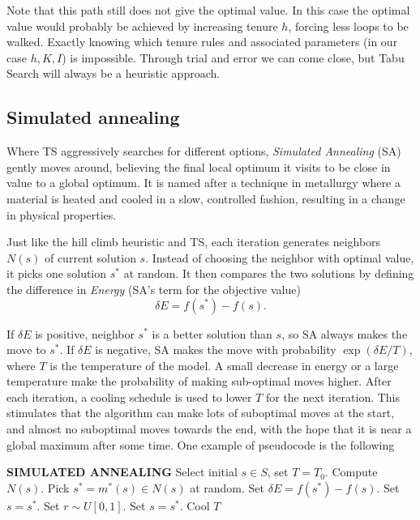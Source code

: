 Note that this path still does not give the optimal value. In this case the optimal value would probably be achieved by increasing tenure $h$, forcing less loops to be walked. Exactly knowing which tenure rules and associated parameters (in our case $h, K, I$) is impossible. Through trial and error we can come close, but Tabu Search will always be a heuristic approach.

\subsection{Simulated annealing}\label{sec:simann}
Where TS aggressively searches for different options, \emph{Simulated Annealing} (SA) gently moves around, believing the final local optimum it visits to be close in value to a global optimum. It is named after a technique in metallurgy where a material is heated and cooled in a slow, controlled fashion, resulting in a change in physical properties.

Just like the hill climb heuristic and TS, each iteration generates neighbors $N(s)$ of current solution $s$. Instead of choosing the neighbor with optimal value, it picks one solution $s^*$ at random. It then compares the two solutions by defining the difference in \emph{Energy} (SA's term for the objective value)
\begin{equation*}
    \delta E = f(s^*) - f(s).
\end{equation*}

If $\delta E$ is positive, neighbor $s^*$ is a better solution than $s$, so SA always makes the move to $s^*$. If $\delta E$ is negative, SA makes the move with probability $\exp(\delta E / T)$, where $T$ is the temperature of the model. A small decrease in energy or a large temperature make the probability of making sub-optimal moves higher. After each iteration, a cooling schedule is used to lower $T$ for the next iteration. This stimulates that the algorithm can make lots of suboptimal moves at the start, and almost no suboptimal moves towards the end, with the hope that it is near a global maximum after some time. One example of pseudocode is the following

\hfill
\begin{algorithmic}[1]
    \BeginBox
    \Statex \textbf{SIMULATED ANNEALING}
    \State Select initial $s\in S$, set $T = T_0$.
    \Repeat
    \State Compute $N(s)$.
    \State Pick $s^* = m^*(s) \in N(s)$ at random.
    \State Set $\delta E = f(s^*) - f(s)$.
    \State Set $s = s^*$.
    \Else
    \State Set $r \sim U[0,1]$. 
    \State Set $s = s^*$.
    \EndIf
    \EndIf
    \State Cool $T$\label{alg:sa:cooling}
    \EndBox
\end{algorithmic}

